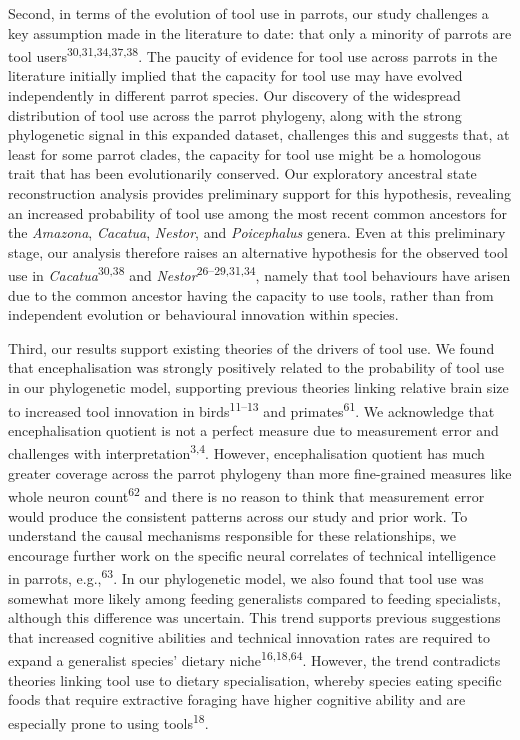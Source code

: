 \documentclass[
  man,floatsintext]{apa6}
\begin{document}
Second, in terms of the evolution of tool use in parrots, our study challenges a
key assumption made in the literature to date: that only a minority of parrots
are tool users\textsuperscript{30,31,34,37,38}.
The paucity of evidence for tool use across parrots in the literature initially
implied that the capacity for tool use may have evolved independently in
different parrot species. Our discovery of the widespread distribution of tool
use across the parrot phylogeny, along with the strong phylogenetic signal in
this expanded dataset, challenges this and suggests that, at least for some
parrot clades, the capacity for tool use might be a homologous trait that has
been evolutionarily conserved. Our exploratory ancestral state reconstruction
analysis provides preliminary support for this hypothesis, revealing an
increased probability of tool use among the most recent common ancestors for the
\emph{Amazona}, \emph{Cacatua}, \emph{Nestor}, and \emph{Poicephalus} genera. Even at this
preliminary stage, our analysis therefore raises an alternative hypothesis for
the observed tool use in \emph{Cacatua}\textsuperscript{30,38} and
\emph{Nestor}\textsuperscript{26--29,31,34}, namely that tool behaviours have arisen due to the
common ancestor having the capacity to use tools, rather than from independent
evolution or behavioural innovation within species.

Third, our results support existing theories of the drivers of tool use. We
found that encephalisation was strongly positively related to the probability of
tool use in our phylogenetic model, supporting previous theories linking
relative brain size to increased tool innovation in birds\textsuperscript{11--13} and primates\textsuperscript{61}. We acknowledge that
encephalisation quotient is not a perfect measure due to measurement error and
challenges with interpretation\textsuperscript{3,4}. However, encephalisation
quotient has much greater coverage across the parrot phylogeny than more
fine-grained measures like whole neuron count\textsuperscript{62} and there is no reason
to think that measurement error would produce the consistent patterns across our
study and prior work. To understand the causal mechanisms responsible for these
relationships, we encourage further work on the specific neural correlates of
technical intelligence in parrots, e.g.,\textsuperscript{63}. In our phylogenetic
model, we also found that tool use was somewhat more likely among feeding
generalists compared to feeding specialists, although this difference was
uncertain. This trend supports previous suggestions that increased cognitive
abilities and technical innovation rates are required to expand a generalist
species' dietary niche\textsuperscript{16,18,64}. However, the trend contradicts theories linking tool use to
dietary specialisation, whereby species eating specific foods that require
extractive foraging have higher cognitive ability and are especially prone to
using tools\textsuperscript{18}.
\end{document}
